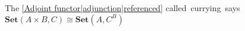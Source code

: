 
The \ref{Adjoint functor|adjunction|referenced} called \,currying\, says $\mathbf{Set}(A \times B,C)\cong \mathbf{Set}(A,C^B)$

